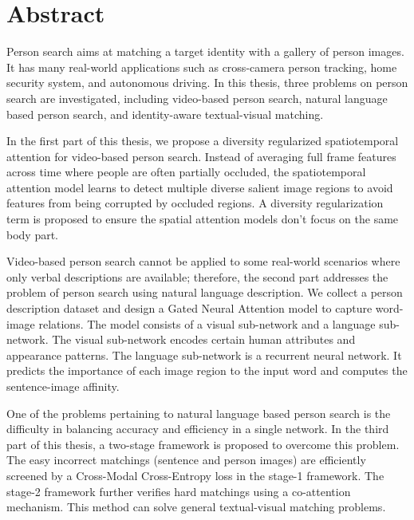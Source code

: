 \chapter*{Abstract}

Person search aims at matching a target identity with a gallery of person images. It has many real-world applications such as cross-camera person tracking, home security system, and autonomous driving. In this thesis, three problems on person search are investigated, including video-based person search, natural language based person search, and identity-aware textual-visual matching.

In the first part of this thesis, we propose a diversity regularized spatiotemporal attention for video-based person search. Instead of averaging full frame features across time where people are often partially occluded, the spatiotemporal attention model learns to detect multiple diverse salient image regions to avoid features from being corrupted by occluded regions. A diversity regularization term is proposed to ensure the spatial attention models don't focus on the same body part.

Video-based person search cannot be applied to some real-world scenarios where only verbal descriptions are available; therefore, the second part addresses the problem of person search using natural language description. We collect a person description dataset and design a Gated Neural Attention model to capture word-image relations. The model consists of a visual sub-network and a language sub-network. The visual sub-network encodes certain human attributes and appearance patterns. The language sub-network is a recurrent neural network. It predicts the importance of each image region to the input word and computes the sentence-image affinity.

One of the problems pertaining to natural language based person search is the difficulty in balancing accuracy and efficiency in a single network. In the third part of this thesis, a two-stage framework is proposed to overcome this problem. The easy incorrect matchings (sentence and person images) are efficiently screened by a Cross-Modal Cross-Entropy loss in the stage-1 framework. The stage-2 framework further verifies hard matchings using a co-attention mechanism. 
This method can solve general textual-visual matching problems.
